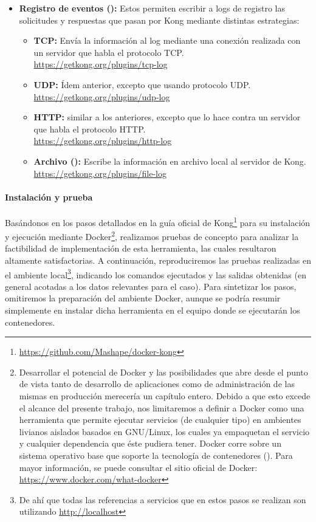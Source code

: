 \begin{itemize}
  \item \textbf{Registro de eventos ():} Estos  permiten escribir a logs de registro las solicitudes y respuestas que pasan por Kong mediante distintas estrategias:
  \begin{itemize}
    \item \textbf{TCP:} Envía la información al log mediante una conexión realizada con un servidor que habla el protocolo TCP. \\
    \url{https://getkong.org/plugins/tcp-log}
    \item \textbf{UDP:} Ídem anterior, excepto que usando protocolo UDP. \\
    \url{https://getkong.org/plugins/udp-log}
    \item \textbf{HTTP:}  similar a los anteriores, excepto que lo hace contra un servidor que habla el protocolo HTTP. \\
    \url{https://getkong.org/plugins/http-log}
    \item \textbf{Archivo ():} Escribe la información en archivo local al servidor de Kong. \\
    \url{https://getkong.org/plugins/file-log}
  \end{itemize}
\end{itemize}

\paragraph{Instalación y prueba}

Basándonos en los pasos detallados en la guía oficial de Kong\footnote{\url{https://github.com/Mashape/docker-kong}} para su instalación y ejecución mediante Docker\footnote{Desarrollar el potencial de Docker y las posibilidades que abre desde el punto de vista tanto de desarrollo de aplicaciones como de administración de las mismas en producción merecería un capítulo entero. Debido a que esto excede el alcance del presente trabajo, nos limitaremos a definir a Docker como una herramienta que permite ejecutar servicios (de cualquier tipo) en ambientes livianos aislados basados en GNU/Linux, los cuales ya empaquetan el servicio y cualquier dependencia que éste pudiera tener. Docker corre sobre un sistema operativo base que soporte la tecnología de contenedores (). Para mayor información, se puede consultar el sitio oficial de Docker: \url{https://www.docker.com/what-docker}}, realizamos pruebas de concepto para analizar la factibilidad de implementación de esta herramienta, las cuales resultaron altamente satisfactorias. A continuación, reproduciremos las pruebas realizadas en el ambiente local\footnote{De ahí que todas las referencias a servicios que en estos pasos se realizan son utilizando \url{http://localhost}}, indicando los comandos ejecutados y las salidas obtenidas (en general acotadas a los datos relevantes para el caso). Para sintetizar los pasos, omitiremos la preparación del ambiente Docker, aunque se podría resumir simplemente en instalar dicha herramienta en el equipo donde se ejecutarán los contenedores.

